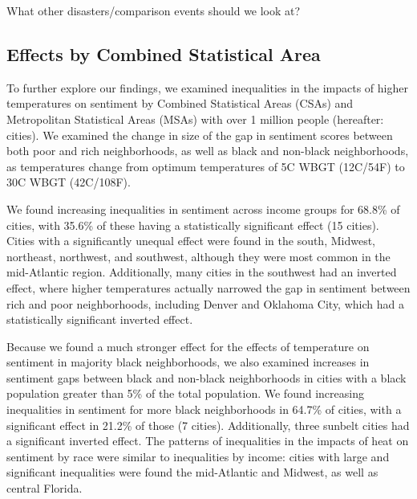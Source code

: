 \documentclass[fleqn,10pt]{wlscirep}
\begin{document}
{\color{red} What other disasters/comparison events should we look at?}

\subsection*{Effects by Combined Statistical Area}

To further explore our findings, we examined inequalities in the impacts of higher temperatures on sentiment by Combined Statistical Areas (CSAs) and Metropolitan Statistical Areas (MSAs) with over 1 million people (hereafter: cities).  We examined the change in size of the gap in sentiment scores between both poor and rich neighborhoods, as well as black and non-black neighborhoods, as temperatures change from optimum temperatures of 5\textdegree C WBGT (12\textdegree C/54\textdegree F) to 30\textdegree C WBGT (42\textdegree C/108\textdegree F).

We found increasing inequalities in sentiment across income groups for 68.8\% of cities, with 35.6\% of these having a statistically significant effect (15 cities).  Cities with a significantly unequal effect were found in the south, Midwest, northeast, northwest, and southwest, although they were most common in the mid-Atlantic region.  Additionally, many cities in the southwest had an inverted effect, where higher temperatures actually narrowed the gap in sentiment between rich and poor neighborhoods, including Denver and Oklahoma City, which had a statistically significant inverted effect.

Because we found a much stronger effect for the effects of temperature on sentiment in majority black neighborhoods, we also examined increases in sentiment gaps between black and non-black neighborhoods in cities with a black population greater than 5\% of the total population.  We found increasing inequalities in sentiment for more black neighborhoods in 64.7\% of cities, with a significant effect in 21.2\% of those (7 cities).  Additionally, three sunbelt cities had a significant inverted effect.  The patterns of inequalities in the impacts of heat on sentiment by race were similar to inequalities by income: cities with large and significant inequalities were found the mid-Atlantic and Midwest, as well as central Florida.
\end{document}
